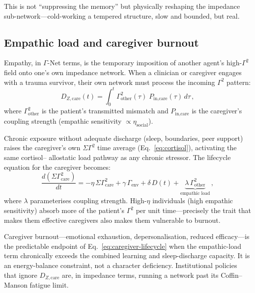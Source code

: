 \documentclass[aps,pre,twocolumn,superscriptaddress,floatfix]{revtex4-2}
\begin{document}
\noindent
This is not ``suppressing the memory'' but physically
reshaping the impedance sub-network---cold-working a
tempered structure, slow and bounded, but real.

\subsection{Empathic load and caregiver burnout}
\label{sec:empathic-load}

Empathy, in $\Gamma$-Net terms, is the temporary
imposition of another agent's high-$\Gamma^2$ field
onto one's own impedance network.
When a clinician or caregiver engages with a trauma
survivor, their own network must process the incoming
$\Gamma^2$ pattern:
\begin{equation}
  D_{Z,\text{care}}(t)
    = \int_0^t \Gamma_{\text{other}}^2(\tau)\;
      P_{\text{in,care}}(\tau)\,d\tau\,,
  \label{eq:caregiver-debt}
\end{equation}
where $\Gamma_{\text{other}}^2$ is the patient's
transmitted mismatch and $P_{\text{in,care}}$ is
the caregiver's coupling strength (empathic sensitivity
$\propto \eta_{\text{social}}$).

Chronic exposure without adequate discharge
(sleep, boundaries, peer support) raises the caregiver's
own $\Sigma\Gamma^2$ time average
(Eq.~\ref{eq:cortisol}), activating the same cortisol--
allostatic load pathway as any chronic stressor.
The lifecycle equation for the caregiver becomes:
\begin{equation}
  \frac{d(\Sigma\Gamma^2_{\text{care}})}{dt}
    = -\eta\,\Sigma\Gamma^2_{\text{care}}
      + \gamma\,\Gamma_{\text{env}}
      + \delta\,D(t)
      + \underbrace{\lambda\,\Gamma_{\text{other}}^2
        }_{\text{empathic load}}\,,
  \label{eq:caregiver-lifecycle}
\end{equation}
where $\lambda$ parameterises coupling strength.
High-$\eta$ individuals (high empathic sensitivity)
absorb more of the patient's $\Gamma^2$ per unit
time---precisely the trait that makes them effective
caregivers also makes them vulnerable to burnout.

\begin{remark}
\label{rem:burnout}
Caregiver burnout---emotional exhaustion, depersonalisation,
reduced efficacy---is the predictable endpoint of
Eq.~\eqref{eq:caregiver-lifecycle} when the empathic-load
term chronically exceeds the combined learning and
sleep-discharge capacity.
It is an energy-balance constraint, not a character
deficiency.
Institutional policies that ignore $D_{Z,\text{care}}$
are, in impedance terms, running a network past its
Coffin--Manson fatigue limit.
\end{remark}
\end{document}
